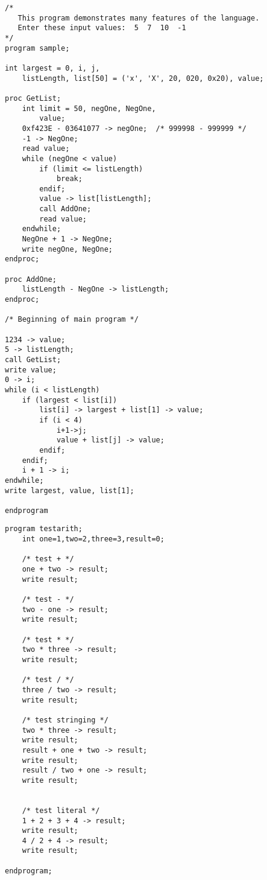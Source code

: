 \begin{program}
\begin{verbatim}
/*
   This program demonstrates many features of the language.
   Enter these input values:  5  7  10  -1
*/
program sample;

int largest = 0, i, j,
    listLength, list[50] = ('x', 'X', 20, 020, 0x20), value;

proc GetList;
    int limit = 50, negOne, NegOne,
        value;
    0xf423E - 03641077 -> negOne;  /* 999998 - 999999 */
    -1 -> NegOne;
    read value;
    while (negOne < value)
        if (limit <= listLength)
            break;
        endif;
        value -> list[listLength];
        call AddOne;
        read value;
    endwhile;
    NegOne + 1 -> NegOne;
    write negOne, NegOne;
endproc;

proc AddOne;
    listLength - NegOne -> listLength;
endproc;

/* Beginning of main program */

1234 -> value;
5 -> listLength;
call GetList;
write value;
0 -> i;
while (i < listLength)
    if (largest < list[i])
        list[i] -> largest + list[1] -> value;
        if (i < 4)
            i+1->j;
            value + list[j] -> value;
        endif;
    endif;
    i + 1 -> i;
endwhile;
write largest, value, list[1];

endprogram

\end{verbatim}
\caption{Listing of program sample.mini}
\end{program}

\begin{program}
\begin{verbatim}
program testarith;
	int one=1,two=2,three=3,result=0;

	/* test + */
	one + two -> result;
	write result;

	/* test - */
	two - one -> result;
	write result;

	/* test * */
	two * three -> result;
	write result;

	/* test / */
	three / two -> result;
	write result;

	/* test stringing */
	two * three -> result;
	write result;
	result + one + two -> result;
	write result;
	result / two + one -> result;
	write result;


	/* test literal */
	1 + 2 + 3 + 4 -> result;
	write result;
	4 / 2 + 4 -> result;
	write result;

endprogram;\end{verbatim}
\caption{Listing of program test\_arith.mini}
\end{program}

